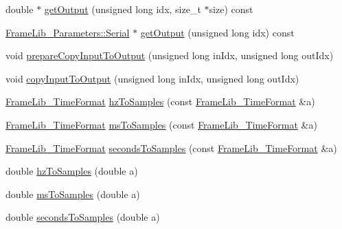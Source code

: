 \begin{DoxyCompactItemize}
\item 
double $\ast$ \hyperlink{class_frame_lib___d_s_p_a5d72363b6d5ee02e0c52e499fd28205d}{get\+Output} (unsigned long idx, size\+\_\+t $\ast$size) const
\item 
\hyperlink{class_frame_lib___parameters_1_1_serial}{Frame\+Lib\+\_\+\+Parameters\+::\+Serial} $\ast$ \hyperlink{class_frame_lib___d_s_p_a18dc23246a8c9d67a0cc468e782fd5c3}{get\+Output} (unsigned long idx) const
\item 
void \hyperlink{class_frame_lib___d_s_p_ab2cd55c5a42a4c0489503a95a7ce0853}{prepare\+Copy\+Input\+To\+Output} (unsigned long in\+Idx, unsigned long out\+Idx)
\item 
void \hyperlink{class_frame_lib___d_s_p_abe84c66d723767ef803c58f9ada7a7de}{copy\+Input\+To\+Output} (unsigned long in\+Idx, unsigned long out\+Idx)
\item 
\hyperlink{struct_frame_lib___time_format}{Frame\+Lib\+\_\+\+Time\+Format} \hyperlink{class_frame_lib___d_s_p_a057aba18ccdae856a2d3db37caab496c}{hz\+To\+Samples} (const \hyperlink{struct_frame_lib___time_format}{Frame\+Lib\+\_\+\+Time\+Format} \&a)
\item 
\hyperlink{struct_frame_lib___time_format}{Frame\+Lib\+\_\+\+Time\+Format} \hyperlink{class_frame_lib___d_s_p_a00480b59f602bac240106d31f89cd293}{ms\+To\+Samples} (const \hyperlink{struct_frame_lib___time_format}{Frame\+Lib\+\_\+\+Time\+Format} \&a)
\item 
\hyperlink{struct_frame_lib___time_format}{Frame\+Lib\+\_\+\+Time\+Format} \hyperlink{class_frame_lib___d_s_p_a61da3eb72a4528839fd0dd40a6c36ec6}{seconds\+To\+Samples} (const \hyperlink{struct_frame_lib___time_format}{Frame\+Lib\+\_\+\+Time\+Format} \&a)
\item 
double \hyperlink{class_frame_lib___d_s_p_a56400e47d4d4b9fb579734af888245c7}{hz\+To\+Samples} (double a)
\item 
double \hyperlink{class_frame_lib___d_s_p_a353058bf6287b8677324c64e12b1ae27}{ms\+To\+Samples} (double a)
\item 
double \hyperlink{class_frame_lib___d_s_p_a4162905cc8f98f87081a268e0fbe40e4}{seconds\+To\+Samples} (double a)
\end{DoxyCompactItemize}
